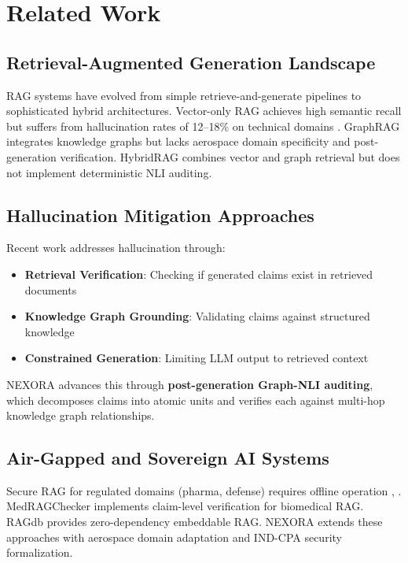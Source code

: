 \documentclass[journal,12pt,twocolumn]{IEEEtran}
\begin{document}
\section{Related Work}

\subsection{Retrieval-Augmented Generation Landscape}

RAG systems have evolved from simple retrieve-and-generate pipelines \cite{lewis2020} to sophisticated hybrid architectures. Vector-only RAG achieves high semantic recall but suffers from hallucination rates of 12--18\% on technical domains \cite{graphrag2025}. GraphRAG \cite{graphrag2025} integrates knowledge graphs but lacks aerospace domain specificity and post-generation verification. HybridRAG \cite{hybridrag2024} combines vector and graph retrieval but does not implement deterministic NLI auditing.

\subsection{Hallucination Mitigation Approaches}

Recent work addresses hallucination through:
\begin{itemize}
\item \textbf{Retrieval Verification}: Checking if generated claims exist in retrieved documents \cite{medragchecker2025}
\item \textbf{Knowledge Graph Grounding}: Validating claims against structured knowledge \cite{ragdb2025}
\item \textbf{Constrained Generation}: Limiting LLM output to retrieved context \cite{xgenq2025}
\end{itemize}

NEXORA advances this through \textbf{post-generation Graph-NLI auditing}, which decomposes claims into atomic units and verifies each against multi-hop knowledge graph relationships.

\subsection{Air-Gapped and Sovereign AI Systems}

Secure RAG for regulated domains (pharma, defense) requires offline operation \cite{airgapped2026}, \cite{secrag2025}. MedRAGChecker \cite{medragchecker2025} implements claim-level verification for biomedical RAG. RAGdb \cite{ragdb2025} provides zero-dependency embeddable RAG. NEXORA extends these approaches with aerospace domain adaptation and IND-CPA security formalization.
\end{document}
